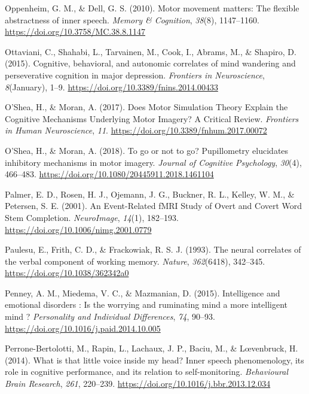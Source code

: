 \documentclass[a4paper,12pt,twoside,openright,oldfontcommands]{memoir}
\begin{document}
\hypertarget{ref-oppenheim_motor_2010}{}
Oppenheim, G. M., \& Dell, G. S. (2010). Motor movement matters: The
flexible abstractness of inner speech. \emph{Memory \& Cognition},
\emph{38}(8), 1147--1160. \url{https://doi.org/10.3758/MC.38.8.1147}

\hypertarget{ref-Ottaviani2015}{}
Ottaviani, C., Shahabi, L., Tarvainen, M., Cook, I., Abrams, M., \&
Shapiro, D. (2015). Cognitive, behavioral, and autonomic correlates of
mind wandering and perseverative cognition in major depression.
\emph{Frontiers in Neuroscience}, \emph{8}(January), 1--9.
\url{https://doi.org/10.3389/fnins.2014.00433}

\hypertarget{ref-oshea_does_2017}{}
O'Shea, H., \& Moran, A. (2017). Does Motor Simulation Theory Explain
the Cognitive Mechanisms Underlying Motor Imagery? A Critical Review.
\emph{Frontiers in Human Neuroscience}, \emph{11}.
\url{https://doi.org/10.3389/fnhum.2017.00072}

\hypertarget{ref-oshea_go_2018}{}
O'Shea, H., \& Moran, A. (2018). To go or not to go? Pupillometry
elucidates inhibitory mechanisms in motor imagery. \emph{Journal of
Cognitive Psychology}, \emph{30}(4), 466--483.
\url{https://doi.org/10.1080/20445911.2018.1461104}

\hypertarget{ref-palmer_event-related_2001}{}
Palmer, E. D., Rosen, H. J., Ojemann, J. G., Buckner, R. L., Kelley, W.
M., \& Petersen, S. E. (2001). An Event-Related fMRI Study of Overt and
Covert Word Stem Completion. \emph{NeuroImage}, \emph{14}(1), 182--193.
\url{https://doi.org/10.1006/nimg.2001.0779}

\hypertarget{ref-paulesu_neural_1993}{}
Paulesu, E., Frith, C. D., \& Frackowiak, R. S. J. (1993). The neural
correlates of the verbal component of working memory. \emph{Nature},
\emph{362}(6418), 342--345. \url{https://doi.org/10.1038/362342a0}

\hypertarget{ref-Penney2015}{}
Penney, A. M., Miedema, V. C., \& Mazmanian, D. (2015). Intelligence and
emotional disorders : Is the worrying and ruminating mind a more
intelligent mind ? \emph{Personality and Individual Differences},
\emph{74}, 90--93. \url{https://doi.org/10.1016/j.paid.2014.10.005}

\hypertarget{ref-Perrone-Bertolotti2014}{}
Perrone-Bertolotti, M., Rapin, L., Lachaux, J. P., Baciu, M., \&
Lœvenbruck, H. (2014). What is that little voice inside my head? Inner
speech phenomenology, its role in cognitive performance, and its
relation to self-monitoring. \emph{Behavioural Brain Research},
\emph{261}, 220--239. \url{https://doi.org/10.1016/j.bbr.2013.12.034}
\end{document}
